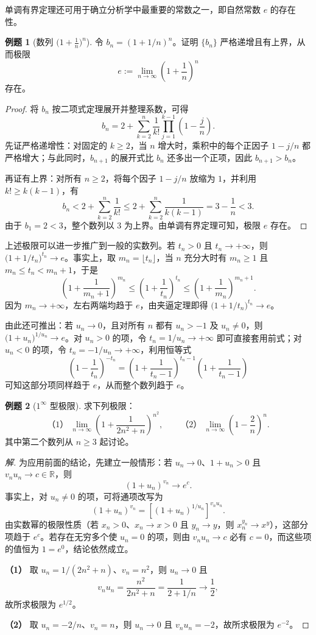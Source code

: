 \documentclass[UTF8, fontset=fandol, a4paper, 12pt]{ctexart}
\newcommand{\R}{\mathbb R}
\theoremstyle{definition}
\newtheorem*{example}{例题}
\begin{document}
单调有界定理还可用于确立分析学中最重要的常数之一，即自然常数 $e$ 的存在性。

\begin{example}[数列 $\bigl(1+\frac1n\bigr)^n$]
令 $b_n=(1+1/n)^n$。证明 $\{b_n\}$ 严格递增且有上界，从而极限
\[
e:=\lim_{n\to\infty}\left(1+\frac1n\right)^n
\]
存在。
\end{example}
\begin{proof}
将 $b_n$ 按二项式定理展开并整理系数，可得
\[
b_n=2+\sum_{k=2}^{n}\frac1{k!}
\prod_{j=1}^{k-1}\left(1-\frac jn\right).
\]
先证严格递增性：对固定的 $k\ge2$，当 $n$ 增大时，乘积中的每个正因子 $1-j/n$ 都严格增大；与此同时，$b_{n+1}$ 的展开式比 $b_n$ 还多出一个正项，因此 $b_{n+1}>b_n$。

再证有上界：对所有 $n\ge2$，将每个因子 $1-j/n$ 放缩为 $1$，并利用 $k!\ge k(k-1)$，有
\[
b_n<2+\sum_{k=2}^{n}\frac1{k!}
\le2+\sum_{k=2}^{n}\frac1{k(k-1)}
=3-\frac1n<3.
\]
由于 $b_1=2<3$，整个数列以 $3$ 为上界。由单调有界定理可知，极限 $e$ 存在。
\end{proof}

上述极限可以进一步推广到一般的实数列。若 $t_n>0$ 且 $t_n\to+\infty$，则 $\bigl(1+1/t_n\bigr)^{t_n}\to e$。事实上，取 $m_n=\lfloor t_n\rfloor$，当 $n$ 充分大时有 $m_n\ge1$ 且 $m_n\le t_n<m_n+1$，于是
\[
\left(1+\frac1{m_n+1}\right)^{m_n}
\le\left(1+\frac1{t_n}\right)^{t_n}
\le\left(1+\frac1{m_n}\right)^{m_n+1}.
\]
因为 $m_n\to+\infty$，左右两端均趋于 $e$，由夹逼定理即得 $\bigl(1+1/t_n\bigr)^{t_n}\to e$。

由此还可推出：若 $u_n\to0$，且对所有 $n$ 都有 $u_n>-1$ 及 $u_n\ne0$，则 $\bigl(1+u_n\bigr)^{1/u_n}\to e$。对 $u_n>0$ 的项，令 $t_n=1/u_n\to+\infty$ 即可直接套用前式；对 $u_n<0$ 的项，令 $t_n=-1/u_n\to+\infty$，利用恒等式
\[
\left(1-\frac1{t_n}\right)^{-t_n}
=\left(1+\frac1{t_n-1}\right)^{t_n-1}
\left(1+\frac1{t_n-1}\right)
\]
可知这部分项同样趋于 $e$，从而整个数列趋于 $e$。

\begin{example}[$1^\infty$ 型极限]
求下列极限：
\[
\text{（1）}\ \lim_{n\to\infty}\left(1+\frac1{2n^2+n}\right)^{n^2},
\qquad
\text{（2）}\ \lim_{n\to\infty}\left(1-\frac2n\right)^n.
\]
其中第二个数列从 $n\ge3$ 起讨论。
\end{example}
\begin{proof}[解]
为应用前面的结论，先建立一般情形：若 $u_n\to0$、$1+u_n>0$ 且 $v_nu_n\to c\in\R$，则
\[
(1+u_n)^{v_n}\longrightarrow e^c.
\]
事实上，对 $u_n\ne0$ 的项，可将通项改写为
\[
(1+u_n)^{v_n}
=\left[(1+u_n)^{1/u_n}\right]^{v_nu_n}.
\]
由实数幂的极限性质（若 $x_n>0$、$x_n\to x>0$ 且 $y_n\to y$，则 $x_n^{y_n}\to x^y$），这部分项趋于 $e^c$。若存在无穷多个使 $u_n=0$ 的项，则由 $v_nu_n\to c$ 必有 $c=0$，而这些项的值恒为 $1=e^0$，结论依然成立。

\textbf{（1）} 取 $u_n=1/(2n^2+n)$、$v_n=n^2$，则 $u_n\to0$ 且
\[
v_nu_n=\frac{n^2}{2n^2+n}=\frac1{2+1/n}\longrightarrow\frac12,
\]
故所求极限为 $e^{1/2}$。

\textbf{（2）} 取 $u_n=-2/n$、$v_n=n$，则 $u_n\to0$ 且 $v_nu_n=-2$，故所求极限为 $e^{-2}$。
\end{proof}
\end{document}
